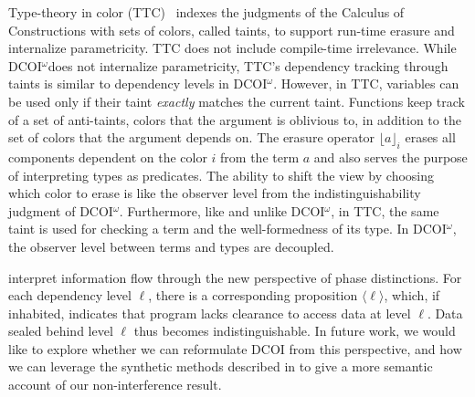 \documentclass[acmsmall]{acmart}
\makeatletter
\theoremstyle{linked}
\theoremstyle{deflinked}
\theoremstyle{acmdefinition}
\newcommand{\name}{\texorpdfstring{DCOI$^{\omega}$\@\xspace}{DCOI-omega}}
\makeatother
\begin{document}


Type-theory in color (TTC)~\citep{bernardy:color} indexes the judgments of the
Calculus of Constructions with sets of colors, called taints, to support run-time erasure
and internalize parametricity. TTC does not include compile-time irrelevance.
While \name does not internalize parametricity, TTC's
dependency tracking through taints is similar to dependency levels in \name.
However, in TTC, variables can be used only if their
taint \emph{exactly} matches the current taint. Functions keep track of a
set of anti-taints, colors that the argument is oblivious to, in
addition to the set of colors that the argument depends on.
The erasure operator $\lfloor a
\rfloor_i$ erases all components dependent on the color $i$ from the
term $a$ and also serves the purpose of interpreting types as
predicates. The ability to shift the view by choosing which color to erase is like
the observer level from the indistinguishability
judgment of \name.
Furthermore, like \citet{pfenning:modal,
abel:irrelevance} and unlike \name, in TTC, the same taint is used for
checking a term and the well-formedness of its type. In \name, the
observer level between terms and types are decoupled.


\citet{sterling:noninterference} interpret information flow through
the new perspective of phase distinctions. For each dependency level
$\ell$, there is a corresponding proposition $\langle \ell \rangle$,
which, if inhabited, indicates that program lacks clearance to access
data at level $\ell$. Data sealed behind level $\ell$ thus becomes
indistinguishable. %
In future work, we would like to explore whether we
can reformulate DCOI from this perspective, and how
we can leverage the synthetic methods described in
\citet{sterling:noninterference, sterling:logrelastypes} to give a
more semantic account of our non-interference result.
\end{document}
